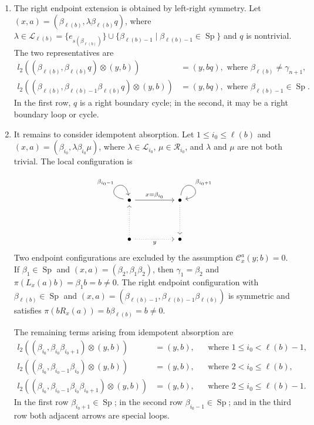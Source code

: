 \documentclass[11pt,a4paper,reqno]{amsart}
\newcommand{\mC}{\mathcal C}
\newcommand{\mL}{\mathcal L}
\newcommand{\mR}{\mathcal R}
\newcommand{\Sp}{\operatorname{Sp}}
\newcommand{\para}[2]{(#1,#2)}
\newcommand{\bi}{\beta_{i_0}}
\newcommand{\bet}{\beta_{\ell(b)}}
\theoremstyle{plain}
\theoremstyle{definition}
\numberwithin{equation}{section}
\begin{document}
\begin{enumerate}
		\item The right endpoint extension is obtained by left-right symmetry.  Let
		$\para{x}{a}=\para{\bet}{\lambda\bet q}$, where
		$\lambda\in\mL_{\ell(b)}=\{e_{s(\bet)}\}\cup
		\{\beta_{\ell(b)-1} \mid \beta_{\ell(b)-1}\in\Sp\}$ and $q$ is nontrivial.  The two representatives are
		\begin{align}
			l_2(\para{\bet}{\bet q}\otimes\para{y}{b})
			&=\para{y}{bq},
			 \text{ where } \bet\neq\gamma_{n+1},\\
			l_2(\para{\bet}{\beta_{\ell(b)-1}\bet q}\otimes\para{y}{b})
			&=\para{y}{bq},
			 \text{ where } \beta_{\ell(b)-1}\in\Sp.
		\end{align}
		In the first row, $q$ is a right boundary cycle; in the second, it may be a
		right boundary loop or cycle.
		
		\item It remains to consider idempotent absorption.  Let
		$1\le i_0\le\ell(b)$ and
		$\para{x}{a}=\para{\bi}{\lambda\bi\mu}$, where
		$\lambda\in\mL_{i_0}$, $\mu\in\mR_{i_0}$, and $\lambda$ and $\mu$ are not both trivial.  The local configuration is
		\[
		\begin{tikzcd}
			\bullet && \bullet \\
			\\
			\bullet && \bullet
			\arrow["{\beta_{i_0-1}}", from=1-1, to=1-1, loop, in=100, out=170, distance=10mm]
			\arrow["{x=\bi}", from=1-1, to=1-3]
			\arrow["{\beta_{i_0+1}}", from=1-3, to=1-3, loop, in=10, out=80, distance=10mm]
			\arrow[dotted, from=1-3, to=3-3]
			\arrow[dotted, from=3-1, to=1-1]
			\arrow["y"', dotted, from=3-1, to=3-3]
		\end{tikzcd}
		\]
		Two endpoint configurations are excluded by the assumption $\mC_x^a(y;b)=0$.  If
		$\beta_1\in\Sp$ and
		$\para{x}{a}=\para{\beta_2}{\beta_1\beta_2}$, then
		$\gamma_1=\beta_2$ and
		$\pi(L_x(a)b)=\beta_1b=b\neq0$.  The right endpoint configuration with
		$\bet\in\Sp$ and
		$\para{x}{a}=\para{\beta_{\ell(b)-1}}{\beta_{\ell(b)-1}\bet}$ is
		symmetric and satisfies $\pi(bR_x(a))=b\bet=b\neq0$.
		
		The remaining terms arising from idempotent absorption are
		\begin{equation}\label{eq:mix-idempotent-absorption}
			\begin{aligned}
				l_2(\para{\bi}{\bi\beta_{i_0+1}}\otimes\para{y}{b})
				&=\para{y}{b},
				&&\text{where } 1\le i_0<\ell(b)-1,\\
				l_2(\para{\bi}{\beta_{i_0-1}\bi}\otimes\para{y}{b})
				&=\para{y}{b},
				&&\text{where } 2<i_0\le\ell(b),\\
				l_2(\para{\bi}{\beta_{i_0-1}\bi\beta_{i_0+1}}\otimes\para{y}{b})
				&=\para{y}{b},
				&&\text{where } 2\le i_0\le\ell(b)-1.
			\end{aligned}
		\end{equation}
		In the first row $\beta_{i_0+1}\in\Sp$; in the second row
		$\beta_{i_0-1}\in\Sp$; and in the third row both adjacent arrows are
		special loops.
	\end{enumerate}
	
\end{document}
